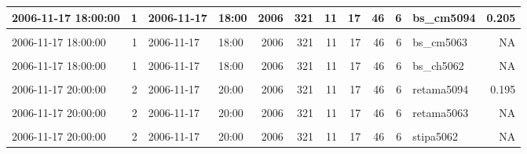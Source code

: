 \documentclass[]{article}
\begin{document}
\begin{table}[H]
{\begin{tabular}[t]{l|r|l|l|r|r|r|r|r|r|l|r}
\hline
2006-11-17 18:00:00 & 1 & 2006-11-17 & 18:00 & 2006 & 321 & 11 & 17 & 46 & 6 & bs\_cm5094 & 0.205\\
\hline
\cellcolor{gray!6}{2006-11-17 18:00:00} & \cellcolor{gray!6}{1} & \cellcolor{gray!6}{2006-11-17} & \cellcolor{gray!6}{18:00} & \cellcolor{gray!6}{2006} & \cellcolor{gray!6}{321} & \cellcolor{gray!6}{11} & \cellcolor{gray!6}{17} & \cellcolor{gray!6}{46} & \cellcolor{gray!6}{6} & \cellcolor{gray!6}{bs\_cm5062} & \cellcolor{gray!6}{NA}\\
\hline
2006-11-17 18:00:00 & 1 & 2006-11-17 & 18:00 & 2006 & 321 & 11 & 17 & 46 & 6 & bs\_cm5063 & NA\\
\hline
\cellcolor{gray!6}{2006-11-17 18:00:00} & \cellcolor{gray!6}{1} & \cellcolor{gray!6}{2006-11-17} & \cellcolor{gray!6}{18:00} & \cellcolor{gray!6}{2006} & \cellcolor{gray!6}{321} & \cellcolor{gray!6}{11} & \cellcolor{gray!6}{17} & \cellcolor{gray!6}{46} & \cellcolor{gray!6}{6} & \cellcolor{gray!6}{bs\_ch5094} & \cellcolor{gray!6}{0.121}\\
\hline
2006-11-17 18:00:00 & 1 & 2006-11-17 & 18:00 & 2006 & 321 & 11 & 17 & 46 & 6 & bs\_ch5062 & NA\\
\hline
\cellcolor{gray!6}{2006-11-17 18:00:00} & \cellcolor{gray!6}{1} & \cellcolor{gray!6}{2006-11-17} & \cellcolor{gray!6}{18:00} & \cellcolor{gray!6}{2006} & \cellcolor{gray!6}{321} & \cellcolor{gray!6}{11} & \cellcolor{gray!6}{17} & \cellcolor{gray!6}{46} & \cellcolor{gray!6}{6} & \cellcolor{gray!6}{bs\_ch5063} & \cellcolor{gray!6}{NA}\\
\hline
2006-11-17 20:00:00 & 2 & 2006-11-17 & 20:00 & 2006 & 321 & 11 & 17 & 46 & 6 & retama5094 & 0.195\\
\hline
\cellcolor{gray!6}{2006-11-17 20:00:00} & \cellcolor{gray!6}{2} & \cellcolor{gray!6}{2006-11-17} & \cellcolor{gray!6}{20:00} & \cellcolor{gray!6}{2006} & \cellcolor{gray!6}{321} & \cellcolor{gray!6}{11} & \cellcolor{gray!6}{17} & \cellcolor{gray!6}{46} & \cellcolor{gray!6}{6} & \cellcolor{gray!6}{retama5062} & \cellcolor{gray!6}{NA}\\
\hline
2006-11-17 20:00:00 & 2 & 2006-11-17 & 20:00 & 2006 & 321 & 11 & 17 & 46 & 6 & retama5063 & NA\\
\hline
\cellcolor{gray!6}{2006-11-17 20:00:00} & \cellcolor{gray!6}{2} & \cellcolor{gray!6}{2006-11-17} & \cellcolor{gray!6}{20:00} & \cellcolor{gray!6}{2006} & \cellcolor{gray!6}{321} & \cellcolor{gray!6}{11} & \cellcolor{gray!6}{17} & \cellcolor{gray!6}{46} & \cellcolor{gray!6}{6} & \cellcolor{gray!6}{stipa5094} & \cellcolor{gray!6}{0.131}\\
\hline
2006-11-17 20:00:00 & 2 & 2006-11-17 & 20:00 & 2006 & 321 & 11 & 17 & 46 & 6 & stipa5062 & NA\\
\hline
\end{tabular}}
\end{table}
\end{document}
